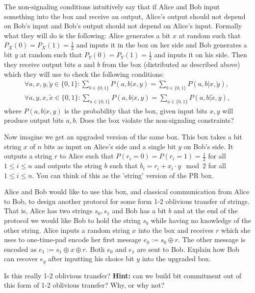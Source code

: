 \documentclass[a4paper,10pt,landscape,twocolumn]{scrartcl}
\begin{document}
\begin{exercise}
\begin{subex}
The non-signaling conditions intuitively say that if Alice and Bob input something into the box and receive an output, Alice's output should not depend on Bob's input and Bob's output should not depend on Alice's input. Formally what they will do is the following: Alice generates a bit $x$ at random such that $P_X(0)=P_X(1)=\frac12$ and inputs it in the box on her side and Bob generates a bit $y$ at random such that $P_Y(0)=P_Y(1)=\frac12$ and inputs it on his side. Then they receive output bits $a$ and $b$ from the box (distributed as described above) which they will use to check the following conditions:
\begin{align*}
\forall a,x,y,\tilde{y} \in \{0,1\}: \sum_{b \in \{0,1\}} P(a,b|x,y)= \sum_{b \in \{0,1\}} P(a,b|x,\tilde{y}), \\
\forall a,y,x,\tilde{x} \in \{0,1\}: \sum_{a \in \{0,1\}} P(a,b|x,y)= \sum_{a \in \{0,1\}} P(a,b|\tilde{x},y),
\end{align*}
where $P(a,b|x,y)$ is the probability that the box, given input bits $x,y$ will produce output bits $a,b$. Does the box violate the non-signaling constraints?
\end{subex}

\begin{subex}
Now imagine we get an upgraded version of the same box. This box takes a bit string $x$ of $n$ bits as input on Alice's side and a single bit $y$ on Bob's side. It outputs a string $r$ to Alice such that $P(r_i=0)=P(r_i=1)=\frac12$ for all $1\leq i \leq n$ and outputs the string $b$ such that $b_i=r_i+x_i \cdot y \mod 2$ for all $1 \leq i \leq n$. You can think of this as the 'string' version of the PR box.

Alice and Bob would like to use this box, and classical communication from Alice to Bob, to design another protocol for some form 1-2 oblivious transfer of strings. That is, Alice has two strings $s_0,s_1$ and Bob has a bit $b$ and at the end of the protocol we would like Bob to hold the string $s_b$ while having no knowledge of the other string. Alice inputs a random string $x$ into the box and receives $r$ which she uses to one-time-pad encode her first message $e_0 := s_0 \oplus r$. The other message is encoded as $e_1 := s_1 \oplus x \oplus r$. Both $e_0$ and $e_1$ are sent to Bob. Explain how Bob can recover $e_y$ after inputting his choice bit $y$ into the upgraded box.

Is this really 1-2 oblivious transfer? 
\textbf{Hint: } can we build bit commitment out of this form of 1-2 oblivious transfer? Why, or why not?
\end{subex}

\end{exercise}
\end{document}
